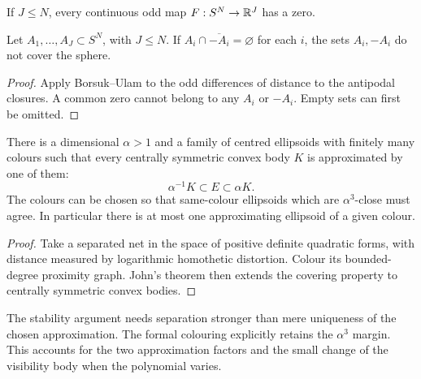 \begin{theorem}
\label{thm:borsuk-ulam}
If $J\leq N$, every continuous odd map $F:S^N\to\mathbb{R}^J$ has a zero.
\end{theorem}

\begin{lemma}
\label{lem:cv-antipodal}
\leanok
Let $A_1,\ldots,A_J\subset S^N$, with $J\leq N$. If
$A_i\cap\overline{-A_i}=\varnothing$ for each $i$, the sets
$A_i,-A_i$ do not cover the sphere.
\end{lemma}
\begin{proof}
\leanok
Apply Borsuk--Ulam to the odd differences of distance to the antipodal
closures. A common zero cannot belong to any $A_i$ or $-A_i$.
Empty sets can first be omitted.
\end{proof}

\begin{lemma}
\label{lem:cv-colouring}
There is a dimensional $\alpha>1$ and a family of centred ellipsoids
with finitely many colours such that every centrally symmetric
convex body $K$ is approximated by one of them:
\[
                    \alpha^{-1}K\subset E\subset\alpha K.
\]
The colours can be chosen so that same-colour ellipsoids which are
$\alpha^3$-close must agree. In particular there is at most one
approximating ellipsoid of a given colour.
\end{lemma}
\begin{proof}
Take a separated net in the space of positive definite quadratic
forms, with distance measured by logarithmic homothetic distortion.
Colour its bounded-degree proximity graph. John's theorem then
extends the covering property to centrally symmetric convex bodies.
\end{proof}

\begin{remark}
\label{rem:cv-colouring}
The stability argument needs separation stronger than mere uniqueness
of the chosen approximation. The formal colouring explicitly retains
the $\alpha^3$ margin. This accounts for the two approximation factors
and the small change of the visibility body when the polynomial varies.
\end{remark}

